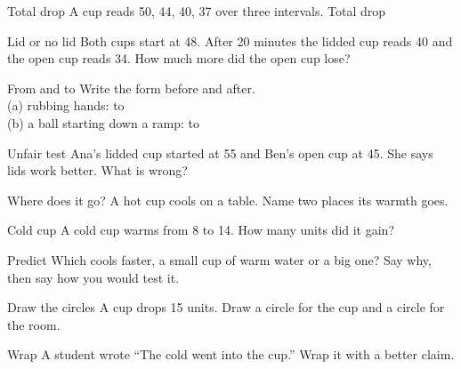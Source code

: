 \clearpage

\begin{puzzle}{Total drop}
A cup reads 50, 44, 40, 37 over three intervals. Total drop \wline[1.6cm]
\end{puzzle}

\begin{puzzle}{Lid or no lid}
Both cups start at 48. After 20 minutes the lidded cup reads 40 and the open cup reads 34. How much more did the open cup lose? \wline[1.6cm]
\end{puzzle}

\begin{puzzle}{From and to}
Write the form before and after.\\
(a) rubbing hands: \wline[2cm] to \wline[2cm]\\
(b) a ball starting down a ramp: \wline[2cm] to \wline[2cm]
\end{puzzle}

\begin{puzzle}{Unfair test}
Ana's lidded cup started at 55 and Ben's open cup at 45. She says lids work better. What is wrong? \wline[6cm]
\end{puzzle}

\begin{puzzle}{Where does it go?}
A hot cup cools on a table. Name two places its warmth goes. \wline[5cm]
\end{puzzle}

\clearpage

\begin{puzzle}{Cold cup}
A cold cup warms from 8 to 14. How many units did it gain? \wline[1.6cm]
\end{puzzle}

\begin{puzzle}{Predict}
Which cools faster, a small cup of warm water or a big one? Say why, then say how you would test it. \wline[6cm]
\end{puzzle}

\begin{puzzle}{Draw the circles}
A cup drops 15 units. Draw a circle for the cup and a circle for the room.
\begin{center}\end{center}
\end{puzzle}

\begin{puzzle}{Wrap}
A student wrote ``The cold went into the cup.'' Wrap it with a better claim. \wline[6cm]
\end{puzzle}

